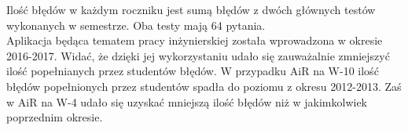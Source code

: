 \documentclass{report}
\begin{document}
		Ilość błędów w każdym roczniku jest sumą błędów z dwóch głównych testów wykonanych w semestrze. Oba testy mają 64 pytania.\\
	
		Aplikacja będąca tematem pracy inżynierskiej została wprowadzona w okresie 2016-2017. Widać, że dzięki jej wykorzystaniu udało się zauważalnie zmniejszyć ilość popełnianych przez studentów błędów. W przypadku AiR na W-10 ilość błędów popełnionych przez studentów spadła do poziomu z okresu 2012-2013. Zaś w AiR na W-4 udało się uzyskać mniejszą ilość błędów niż w jakimkolwiek poprzednim okresie.
	
			
\end{document}
